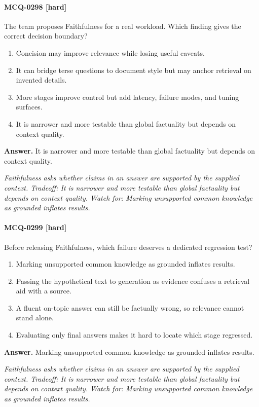 \paragraph{MCQ-0298 [hard]} The team proposes Faithfulness for a real workload. Which finding gives the correct decision boundary?
\begin{enumerate}[label=\Alph*.]
\item Concision may improve relevance while losing useful caveats.
\item It can bridge terse questions to document style but may anchor retrieval on invented details.
\item More stages improve control but add latency, failure modes, and tuning surfaces.
\item It is narrower and more testable than global factuality but depends on context quality.
\end{enumerate}
\noindent\textbf{Answer.} It is narrower and more testable than global factuality but depends on context quality.
\par\textit{Faithfulness asks whether claims in an answer are supported by the supplied context. Tradeoff: It is narrower and more testable than global factuality but depends on context quality. Watch for: Marking unsupported common knowledge as grounded inflates results.}
\paragraph{MCQ-0299 [hard]} Before releasing Faithfulness, which failure deserves a dedicated regression test?
\begin{enumerate}[label=\Alph*.]
\item Marking unsupported common knowledge as grounded inflates results.
\item Passing the hypothetical text to generation as evidence confuses a retrieval aid with a source.
\item A fluent on-topic answer can still be factually wrong, so relevance cannot stand alone.
\item Evaluating only final answers makes it hard to locate which stage regressed.
\end{enumerate}
\noindent\textbf{Answer.} Marking unsupported common knowledge as grounded inflates results.
\par\textit{Faithfulness asks whether claims in an answer are supported by the supplied context. Tradeoff: It is narrower and more testable than global factuality but depends on context quality. Watch for: Marking unsupported common knowledge as grounded inflates results.}
